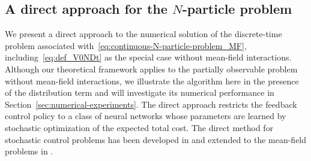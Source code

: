 \documentclass[11pt]{article}
\numberwithin{equation}{section}
\theoremstyle{plain}
\theoremstyle{definition}
\theoremstyle{remark}
\begin{document}
	\subsection{A direct approach for the \texorpdfstring{$N$}{}-particle problem} \label{subsec:direct-approach}
	
	We present a direct approach to the numerical solution of the discrete-time problem associated with~\eqref{eq:continuous-N-particle-problem_MF}, including~\eqref{eq:def_V0NDt} as the special case without mean-field interactions. Although our theoretical framework applies to the partially observable problem without mean-field interactions, we illustrate the algorithm here in the presence of the distribution term and will investigate its numerical performance in Section~\ref{sec:numerical-experiments}. The direct approach restricts the feedback control policy to a class of neural networks whose parameters are learned by stochastic optimization of the expected total cost. The direct method for stochastic control problems has been developed in \cite{han2016deep} and extended to the mean-field problems in \cite{carmona2022convergence}.
	
\end{document}
